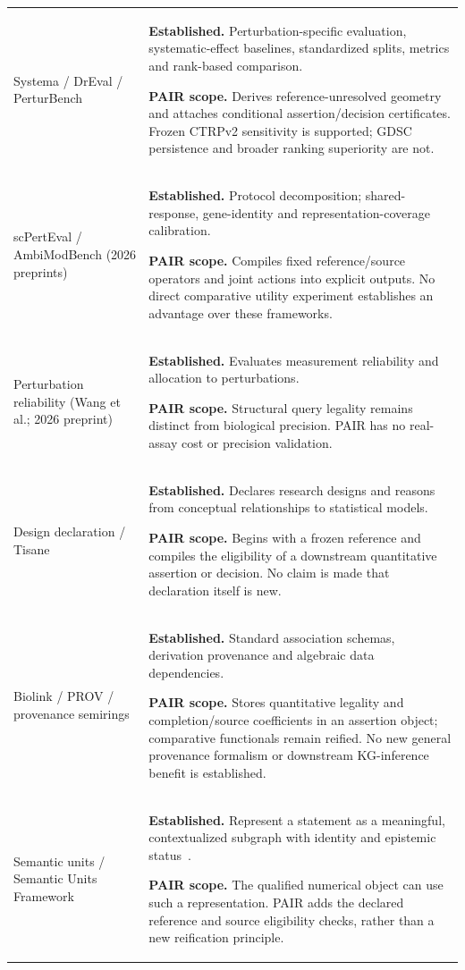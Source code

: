 \documentclass[11pt]{article}
\begin{document}
\begin{longtable}{@{}>{\raggedright\arraybackslash}p{}>{\raggedright\arraybackslash}p{}@{}}
Systema / DrEval / PerturBench & \textbf{Established.} Perturbation-specific evaluation, systematic-effect baselines, standardized splits, metrics and rank-based comparison. \par\smallskip\textbf{PAIR scope.} Derives reference-unresolved geometry and attaches conditional assertion/decision certificates. Frozen CTRPv2 sensitivity is supported; GDSC persistence and broader ranking superiority are not.  \\
scPertEval / AmbiModBench (2026 preprints) & \textbf{Established.} Protocol decomposition; shared-response, gene-identity and representation-coverage calibration. \par\smallskip\textbf{PAIR scope.} Compiles fixed reference/source operators and joint actions into explicit outputs. No direct comparative utility experiment establishes an advantage over these frameworks.  \\
Perturbation reliability (Wang et al.; 2026 preprint) & \textbf{Established.} Evaluates measurement reliability and allocation to perturbations. \par\smallskip\textbf{PAIR scope.} Structural query legality remains distinct from biological precision. PAIR has no real-assay cost or precision validation.  \\
Design declaration / Tisane & \textbf{Established.} Declares research designs and reasons from conceptual relationships to statistical models. \par\smallskip\textbf{PAIR scope.} Begins with a frozen reference and compiles the eligibility of a downstream quantitative assertion or decision. No claim is made that declaration itself is new.  \\
Biolink / PROV / provenance semirings & \textbf{Established.} Standard association schemas, derivation provenance and algebraic data dependencies. \par\smallskip\textbf{PAIR scope.} Stores quantitative legality and completion/source coefficients in an assertion object; comparative functionals remain reified. No new general provenance formalism or downstream KG-inference benefit is established.  \\
Semantic units / Semantic Units Framework & \textbf{Established.} Represent a statement as a meaningful, contextualized subgraph with identity and epistemic status~\cite{vogt2024semanticunits,vogt2026framework}. \par\smallskip\textbf{PAIR scope.} The qualified numerical object can use such a representation. PAIR adds the declared reference and source eligibility checks, rather than a new reification principle.  \\

\end{longtable}
\end{document}
